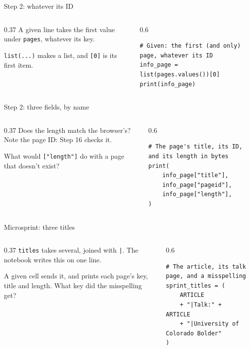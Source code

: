 \documentclass[9pt,aspectratio=169]{beamer}
\begin{document}
\begin{frame}[fragile]{Step 2: whatever its ID}
    \begin{columns}[T]
        \begin{column}{0.37\textwidth}
            A given line takes the first value under \texttt{pages}, whatever its key.

            \medskip
            \texttt{list(...)} makes a list, and \texttt{[0]} is its first item.
        \end{column}
        \begin{column}{0.6\textwidth}
\begin{lstlisting}
# Given: the first (and only) page, whatever its ID
info_page = list(pages.values())[0]
print(info_page)
\end{lstlisting}
        \end{column}
    \end{columns}
\end{frame}

\begin{frame}[fragile]{Step 2: three fields, by name}
    \begin{columns}[T]
        \begin{column}{0.37\textwidth}
            Does the length match the browser's? Note the page ID: Step 16 checks it.

            \medskip
            What would \texttt{["length"]} do with a page that doesn't exist?
        \end{column}
        \begin{column}{0.6\textwidth}
\begin{lstlisting}
# The page's title, its ID, and its length in bytes
print(
    info_page["title"],
    info_page["pageid"],
    info_page["length"],
)
\end{lstlisting}
        \end{column}
    \end{columns}
\end{frame}

\begin{frame}[fragile]{Microsprint: three titles}
    \begin{columns}[T]
        \begin{column}{0.37\textwidth}
            \texttt{titles} takes several, joined with \texttt{|}. The notebook writes this on one line.

            \medskip
            A given cell sends it, and prints each page's key, title and length. What key did the misspelling get?
        \end{column}
        \begin{column}{0.6\textwidth}
\begin{lstlisting}
# The article, its talk page, and a misspelling
sprint_titles = (
    ARTICLE
    + "|Talk:" + ARTICLE
    + "|University of Colorado Bolder"
)
\end{lstlisting}
        \end{column}
    \end{columns}
\end{frame}
\end{document}
